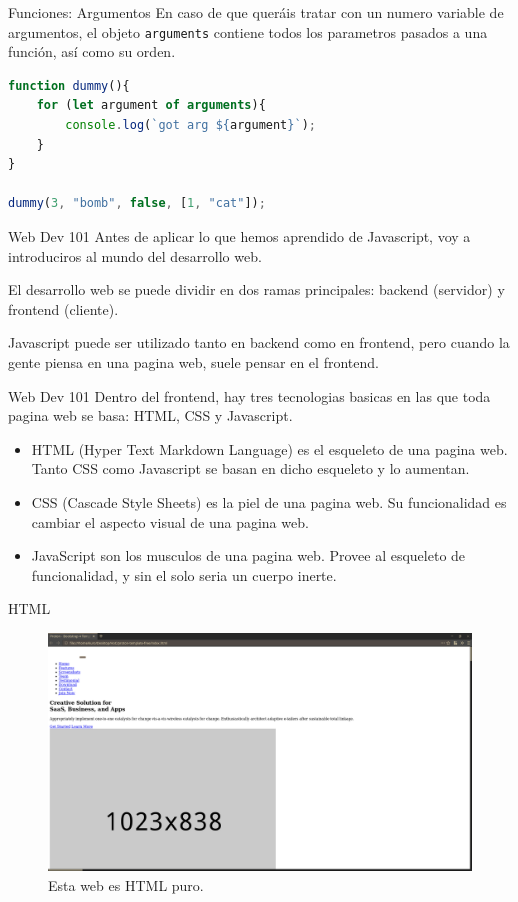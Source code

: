 \documentclass{beamer}
\begin{document}
\begin{frame}[fragile]{Funciones: Argumentos}
En caso de que queráis tratar con un numero variable de argumentos, el objeto {\verb|arguments|} contiene todos los parametros pasados a una función, así como su orden.

\begin{lstlisting}[language=JavaScript]
function dummy(){
    for (let argument of arguments){
        console.log(`got arg ${argument}`);
    }
}

dummy(3, "bomb", false, [1, "cat"]);
\end{lstlisting}
\end{frame}

\begin{frame}{Web Dev 101}
Antes de aplicar lo que hemos aprendido de Javascript, voy a introduciros al mundo del desarrollo web.

El desarrollo web se puede dividir en dos ramas principales: backend (servidor) y frontend (cliente).

Javascript puede ser utilizado tanto en backend como en frontend, pero cuando la gente piensa en una pagina web, suele pensar en el frontend.
    
\end{frame}

\begin{frame}{Web Dev 101}
Dentro del frontend, hay tres tecnologias basicas en las que toda pagina web se basa: HTML, CSS y Javascript.
\begin{itemize}
    \item HTML (Hyper Text Markdown Language) es el esqueleto de una pagina web. Tanto CSS como Javascript se basan en dicho esqueleto y lo aumentan.
    \item CSS (Cascade Style Sheets) es la piel de una pagina web. Su funcionalidad es cambiar el aspecto visual de una pagina web.
    \item JavaScript son los musculos de una pagina web. Provee al esqueleto de funcionalidad, y sin el solo seria un cuerpo inerte.
\end{itemize}
\end{frame}

\begin{frame}{HTML}
\begin{figure}
    \centering
    \includegraphics[width=\textwidth]{images/nocss.png}
    \caption{Esta web es HTML puro.}
\end{figure}
\end{frame}
\end{document}
